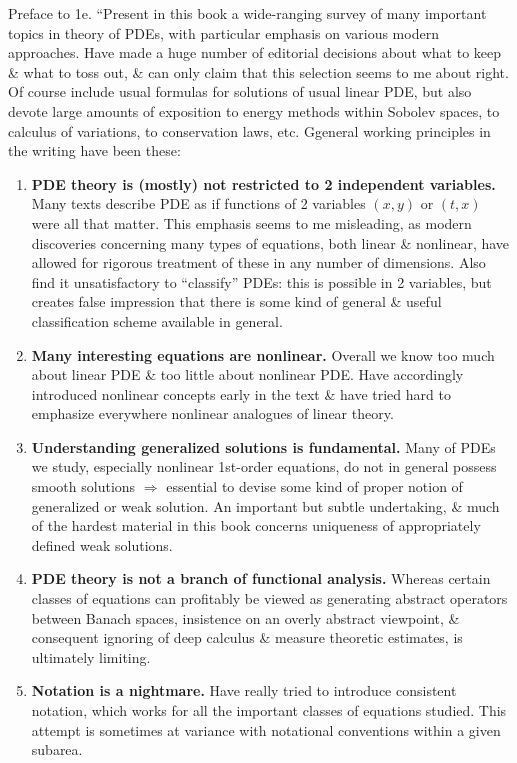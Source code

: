 \documentclass{article}
\begin{document}
\begin{enumerate}
	{\sf Preface to 1e.} ``Present in this book a wide-ranging survey of many important topics in theory of PDEs, with particular emphasis on various modern approaches. Have made a huge number of editorial decisions about what to keep \& what to toss out, \& can only claim that this selection seems to me about right. Of course include usual formulas for solutions of usual linear PDE, but also devote large amounts of exposition to energy methods within Sobolev spaces, to calculus of variations, to conservation laws, etc. Ggeneral working principles in the writing have been these:
	\begin{enumerate}
		\item {\bf PDE theory is (mostly) not restricted to 2 independent variables.} Many texts describe PDE as if functions of 2 variables $(x,y)$ or $(t,x)$ were all that matter. This emphasis seems to me misleading, as modern discoveries concerning many types of equations, both linear \& nonlinear, have allowed for rigorous treatment of these in any number of dimensions. Also find it unsatisfactory to ``classify'' PDEs: this is possible in 2 variables, but creates false impression that there is some kind of general \& useful classification scheme available in general.
		\item {\bf Many interesting equations are nonlinear.} Overall we know too much about linear PDE \& too little about nonlinear PDE. Have accordingly introduced nonlinear concepts early in the text \& have tried hard to emphasize everywhere nonlinear analogues of linear theory.
		\item {\bf Understanding generalized solutions is fundamental.} Many of PDEs we study, especially nonlinear 1st-order equations, do not in general possess smooth solutions $\Rightarrow$ essential to devise some kind of proper notion of generalized or weak solution. An important but subtle undertaking, \& much of the hardest material in this book concerns uniqueness of appropriately defined weak solutions.
		\item {\bf PDE theory is not a branch of functional analysis.} Whereas certain classes of equations can profitably be viewed as generating abstract operators between Banach spaces, insistence on an overly abstract viewpoint, \& consequent ignoring of deep calculus \& measure theoretic estimates, is ultimately limiting.
		\item {\bf Notation is a nightmare.} Have really tried to introduce consistent notation, which works for all the important classes of equations studied. This attempt is sometimes at variance with notational conventions within a given subarea.

\end{enumerate}
\end{enumerate}
\end{document}
